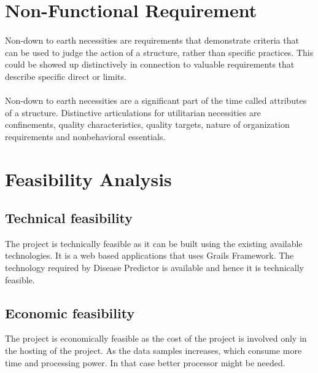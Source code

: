 \documentclass{book}
\begin{document}
    	
    	\section{Non-Functional Requirement}
    	\paragraph{}
    	Non-down to earth necessities are requirements that demonstrate criteria that can be used to judge the action of a structure, rather than specific practices. This could be showed up distinctively in connection to valuable requirements that describe specific direct or limits.
    	\paragraph{}
    	Non-down to earth necessities are a significant part of the time called attributes of a structure. Distinctive articulations for utilitarian necessities are confinements, quality characteristics, quality targets, nature of organization requirements and nonbehavioral essentials.
    	
    	\section{Feasibility Analysis}
    	\subsection{Technical feasibility} 
    	The project is technically feasible as it can be built using the existing available technologies. It is a web based applications that uses Grails Framework. The technology required by Disease Predictor is available and hence it is technically feasible.
    	
    	\subsection{Economic feasibility} 
    	The project is economically feasible as the cost of the project is involved only in the hosting of the project. As the data samples increases, which consume more time and processing power. In that case better processor might be needed.
    	   
    
\end{document}
